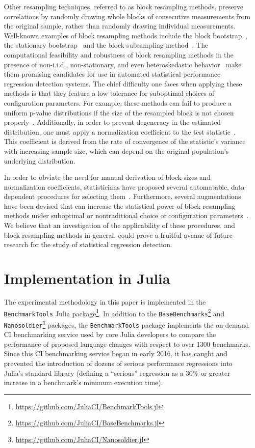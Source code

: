\documentclass[conference]{IEEEtran}
\begin{document}
Other resampling techniques, referred to as block resampling methods, preserve correlations
by randomly drawing whole blocks of consecutive measurements from the original sample,
rather than randomly drawing individual measurements. Well-known examples of block
resampling methods include the block bootstrap~\cite{Kunsch1989}, the stationary
bootstrap~\cite{Politis1994} and the block subsampling method~\cite{Politis1999}. The
computational feasibility and robustness of block resampling methods in the presence of
non-i.i.d., non-stationary, and even heteroskedastic behavior~\cite{Politis1999,Politis1997}
make them promising candidates for use in automated statistical performance regression
detection systems. The chief difficulty one faces when applying these methods is that they
feature a low tolerance for suboptimal choices of configuration parameters. For example,
these methods can fail to produce a uniform p-value distributions if the size of the
resampled block is not chosen properly~\cite{Shao2013}. Additionally, in order to prevent
degeneracy in the estimated distribution, one must apply a normalization coefficient to the
test statistic~\cite{Politis1999}. This coefficient is derived from the rate of convergence
of the statistic's variance with increasing sample size, which can depend on the original
population's underlying distribution.

In order to obviate the need for manual derivation of block sizes and normalization
coefficients, statisticians have proposed several automatable, data-dependent procedures for
selecting them~\cite{Politis2004,Bickel2008}. Furthermore, several augmentations have been
devised that can increase the statistical power of block resampling methods under suboptimal
or nontraditional choice of configuration parameters~\cite{Berg2010,Shao2013}. We believe
that an investigation of the applicability of these procedures, and block resampling methods
in general, could prove a fruitful avenue of future research for the study of statistical
regression detection.

\section{Implementation in Julia}
\label{sec:implementation}

The experimental methodology in this paper is implemented in the \lstinline|BenchmarkTools|
Julia package\footnote{\url{https://github.com/JuliaCI/BenchmarkTools.jl}}. In addition to
the \lstinline|BaseBenchmarks|\footnote{\url{https://github.com/JuliaCI/BaseBenchmarks.jl}}
and \lstinline|Nanosoldier|\footnote{\url{https://github.com/JuliaCI/Nanosoldier.jl}}
packages, the \lstinline|BenchmarkTools| package implements the on-demand CI benchmarking
service used by core Julia developers to compare the performance of proposed language
changes with respect to over 1300 benchmarks. Since this CI benchmarking service began in
early 2016, it has caught and prevented the introduction of dozens of serious performance
regressions into Julia's standard library (defining a ``serious'' regression as a $30\%$ or
greater increase in a benchmark's minimum execution time).
\end{document}
